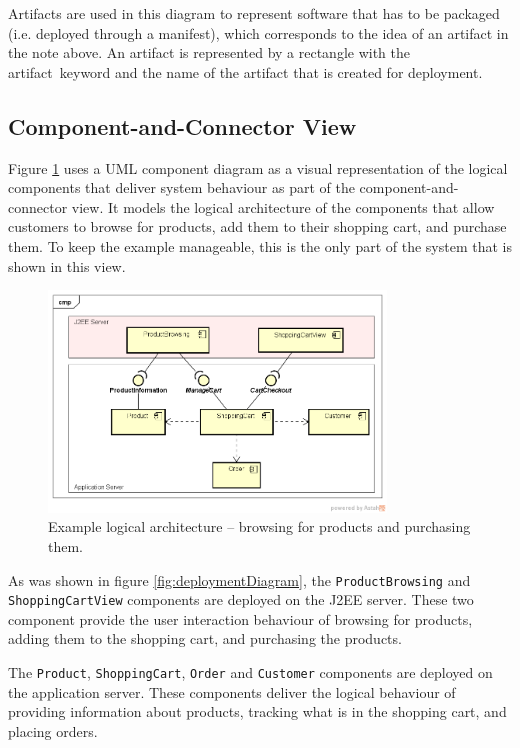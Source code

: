 Artifacts are used in this diagram to represent software that has to be packaged
(i.e. deployed through a manifest), which corresponds to the idea of an artifact in the note above.
An artifact is represented by a rectangle with the \guillemotleft artifact\guillemotright~keyword and the name of the artifact that is created for deployment.

\subsection{Component-and-Connector View}\label{sec:cnc_view}
Figure \ref{fig:componentDiagram} uses a UML component diagram as a visual representation of
the logical components that deliver system behaviour as part of the component-and-connector view.
It models the logical architecture of the components that allow customers to browse for products, add them to their shopping cart, and purchase them.
To keep the example manageable, this is the only part of the system that is shown in this view.

\begin{figure}[h]
    \centering
    \includegraphics[trim=39 37 22 49,clip,width=0.8\textwidth]{images/uml/component_diagram.png}
    \caption{Example logical architecture -- browsing for products and purchasing them.}
    \label{fig:componentDiagram}
\end{figure}

As was shown in figure \ref{fig:deploymentDiagram}, the \texttt{ProductBrowsing} and \texttt{ShoppingCartView} components are deployed on the J2EE server.
These two component provide the user interaction behaviour of browsing for products, adding them to the shopping cart, and purchasing the products.

The \texttt{Product}, \texttt{ShoppingCart}, \texttt{Order} and \texttt{Customer} components are deployed on the application server.
These components deliver the logical behaviour of providing information about products, tracking what is in the shopping cart, and placing orders.


